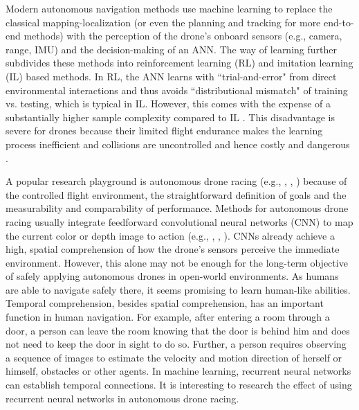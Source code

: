Modern autonomous navigation methods use machine learning
to replace the classical mapping-localization 
(or even the planning and tracking for more end-to-end methods) 
with the perception of the drone's onboard sensors
(e.g., camera, range, IMU)
and the decision-making of an ANN.
The way of learning further subdivides these methods into
reinforcement learning (RL) and imitation learning (IL) based methods.
In RL, the ANN learns with ``trial-and-error" \cite{Sadeghi2016}
from direct environmental interactions 
and thus avoids ``distributional mismatch" \cite{RobotAutonomy2}  
of training vs. testing, which is typical in IL.
However, this comes with the expense of a
substantially higher sample complexity 
compared to IL \cite{Zhu2017}.
This disadvantage is severe for drones because 
their limited flight endurance 
makes the learning process inefficient 
and collisions are uncontrolled and 
hence costly and dangerous \cite{Sadeghi2016}.

A popular research playground is autonomous drone racing
(e.g., \cite{Moon2019}, \cite{Jung2018}, \cite{Song2021})
because of the controlled flight environment,
the straightforward definition of goals
and the measurability and comparability of performance.
Methods for autonomous drone racing usually
integrate feedforward
convolutional neural networks (CNN) 
to map the current color or depth image to action
(e.g., \cite{RojasPerez2020}, \cite{Kaufmann2019}, \cite{Jung2018a}).
CNNs already achieve 
a high, spatial comprehension of how the drone's sensors perceive
the immediate environment.
However, this alone may not
be enough for the long-term objective of safely 
applying autonomous drones in open-world environments.
As humans are able to navigate safely there,
it seems promising to learn human-like abilities.
Temporal comprehension,
besides spatial comprehension,
has an important function in human navigation. 
For example, 
after entering a room through a door, 
a person can leave the room knowing 
that the door is behind him and 
does not need to keep the door in sight to do so.
Further, a person requires 
observing a sequence of images to
estimate the velocity and motion direction of herself or himself, 
obstacles or other agents.
In machine learning, recurrent neural networks
can establish temporal connections.
It is interesting to research the 
effect of using recurrent neural networks in autonomous drone racing.









